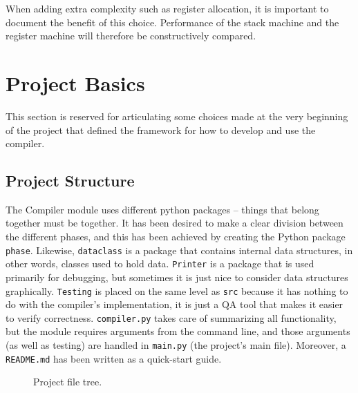 When adding extra complexity such as register allocation, it is important to document the benefit of this choice. Performance of the stack machine and the register machine will therefore be constructively compared.

\chapter{Project Basics}
This section is reserved for articulating some choices made at the very beginning of the project that defined the framework for how to develop and use the compiler.

\section{Project Structure}
The Compiler module uses different python packages -- things that belong together must be together. It has been desired to make a clear division between the different phases, and this has been achieved by creating the Python package \texttt{phase}. Likewise, \texttt{dataclass} is a package that contains internal data structures, in other words, classes used to hold data. \texttt{Printer} is a package that is used primarily for debugging, but sometimes it is just nice to consider data structures graphically. \texttt{Testing} is placed on the same level as \texttt{src} because it has nothing to do with the compiler's implementation, it is just a QA tool that makes it easier to verify correctness. \texttt{compiler.py} takes care of summarizing all functionality, but the module requires arguments from the command line, and those arguments (as well as testing) are handled in \texttt{main.py} (the project's main file). Moreover, a \texttt{README.md} has been written as a quick-start guide.

\begin{figure}[H]
    \centering
    \begin{subfigure}{0.3\textwidth}
    \centering
    
    \end{subfigure}        
    \hfill
    \begin{subfigure}{0.3\textwidth}
    \centering
    
    \end{subfigure}
    \hfill
    \begin{subfigure}{0.3\textwidth}
    \centering
    
    \end{subfigure}
    \caption{Project file tree.}
\end{figure}

